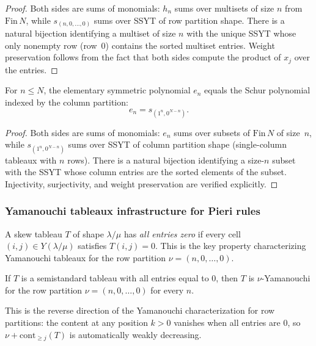 \begin{proof}
Both sides are sums of monomials: $h_n$ sums over multisets of size $n$ from $\mathrm{Fin}\,N$,
while $s_{(n,0,\ldots,0)}$ sums over SSYT of row partition shape.
There is a natural bijection identifying a multiset of size $n$ with
the unique SSYT whose only nonempty row (row~$0$) contains the sorted
multiset entries.
Weight preservation follows from the fact that both sides compute the
product of $x_j$ over the entries.
\end{proof}

\begin{theorem}
\label{thm.sf.esymm-eq-schur-col}
\leanhelper
\leanok
For $n \leq N$, the elementary symmetric polynomial $e_n$ equals
the Schur polynomial indexed by the column partition:
\[
e_n = s_{(1^n, 0^{N-n})}.
\]
\end{theorem}

\begin{proof}
Both sides are sums of monomials: $e_n$ sums over subsets of
$\mathrm{Fin}\,N$ of size~$n$, while $s_{(1^n,0^{N-n})}$ sums over
SSYT of column partition shape (single-column tableaux with $n$ rows).
There is a natural bijection identifying a size-$n$ subset
with the SSYT whose column entries are the sorted elements of the subset.
Injectivity, surjectivity, and weight preservation are verified explicitly.
\end{proof}

\subsubsection{Yamanouchi tableaux infrastructure for Pieri rules}

\begin{definition}
\label{def.sf.all-entries-zero}
\leanhelper
\leanok
A skew tableau $T$ of shape $\lambda/\mu$ has \emph{all entries zero} if
every cell $(i, j) \in Y(\lambda/\mu)$ satisfies $T(i, j) = 0$.
This is the key property characterizing Yamanouchi tableaux for the
row partition $\nu = (n, 0, \ldots, 0)$.
\end{definition}

\begin{theorem}
\label{thm.sf.all-entries-zero-yamanouchi}
\leanhelper
\leanok
If $T$ is a semistandard tableau with all entries equal to $0$, then
$T$ is $\nu$-Yamanouchi for the row partition $\nu = (n, 0, \ldots, 0)$
for every $n$.

This is the reverse direction of the Yamanouchi characterization for row
partitions: the content at any position $k > 0$ vanishes when all entries
are $0$, so $\nu + \mathrm{cont}_{\geq j}(T)$ is automatically weakly
decreasing.
\end{theorem}

